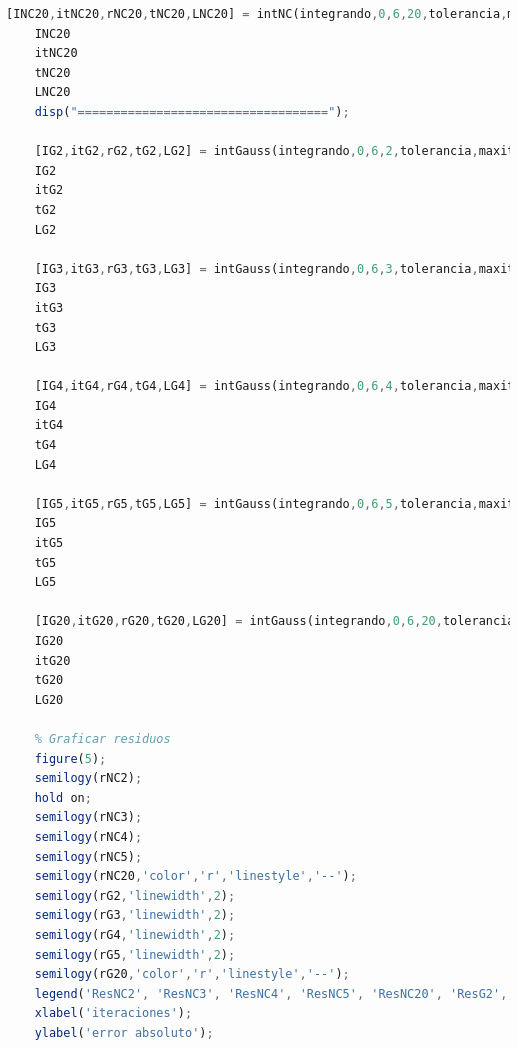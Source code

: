 \documentclass{article}
\begin{document}
\begin{lstlisting}[language=Octave]
    [INC20,itNC20,rNC20,tNC20,LNC20] = intNC(integrando,0,6,20,tolerancia,maxit);
    INC20
    itNC20
    tNC20
    LNC20
    disp("===================================");
    
    [IG2,itG2,rG2,tG2,LG2] = intGauss(integrando,0,6,2,tolerancia,maxit);
    IG2
    itG2
    tG2
    LG2
    
    [IG3,itG3,rG3,tG3,LG3] = intGauss(integrando,0,6,3,tolerancia,maxit);
    IG3
    itG3
    tG3
    LG3
    
    [IG4,itG4,rG4,tG4,LG4] = intGauss(integrando,0,6,4,tolerancia,maxit);
    IG4
    itG4
    tG4
    LG4
    
    [IG5,itG5,rG5,tG5,LG5] = intGauss(integrando,0,6,5,tolerancia,maxit);
    IG5
    itG5
    tG5
    LG5
    
    [IG20,itG20,rG20,tG20,LG20] = intGauss(integrando,0,6,20,tolerancia,maxit);
    IG20
    itG20
    tG20
    LG20
    
    % Graficar residuos
    figure(5);
    semilogy(rNC2);
    hold on;
    semilogy(rNC3);
    semilogy(rNC4);
    semilogy(rNC5);
    semilogy(rNC20,'color','r','linestyle','--');
    semilogy(rG2,'linewidth',2);
    semilogy(rG3,'linewidth',2);
    semilogy(rG4,'linewidth',2);
    semilogy(rG5,'linewidth',2);
    semilogy(rG20,'color','r','linestyle','--');
    legend('ResNC2', 'ResNC3', 'ResNC4', 'ResNC5', 'ResNC20', 'ResG2', 'ResG3', 'ResG4', 'ResG5', 'ResG20');
    xlabel('iteraciones');
    ylabel('error absoluto');
    \end{lstlisting}
\end{document}
